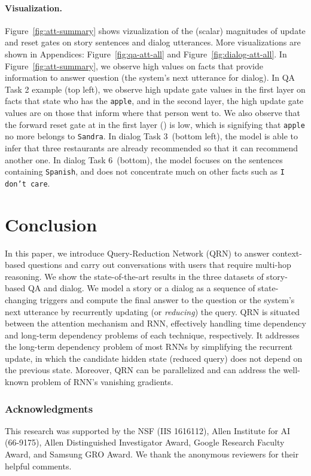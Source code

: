 \documentclass[table]{article}
\begin{document}
\paragraph{Visualization.}
Figure~\ref{fig:att-summary} shows vizualization of the (scalar) magnitudes of update and reset gates on story sentences and dialog utterances.
More visualizations are shown in Appendices: Figure~\ref{fig:qa-att-all} and Figure~\ref{fig:dialog-att-all}.
In Figure~\ref{fig:att-summary}, we observe high values on facts that provide information to answer question (the system's next utterance for dialog).
In QA Task 2 example (top left), we observe high update gate values  in the first layer on facts that state who has the \texttt{apple}, and in the second layer, the high update gate values are on those that inform where that person went to. We also observe that the forward reset gate at  in the first layer () is low, which is signifying that \texttt{apple} no more belongs to \texttt{Sandra}. In dialog Task 3~(bottom left), the model is able to infer that three restaurants are already recommended so that it can recommend another one. In dialog Task 6~(bottom), the model focuses on the sentences containing \texttt{Spanish}, and does not concentrate much on other facts such as \texttt{I don't care}.
 


\section{Conclusion} 
\vspace{-.3cm}
In this paper, we introduce Query-Reduction Network (QRN)  to answer context-based questions and carry out conversations with users that require multi-hop reasoning. 
We show the state-of-the-art results in the three datasets of story-based QA and dialog. 
We model a story or a dialog as a sequence of state-changing triggers and compute the final answer to the question or the system's next utterance by recurrently updating (or \emph{reducing}) the query.
QRN is situated between the attention mechanism and RNN, effectively handling time dependency and long-term dependency problems of each technique, respectively.  It addresses the long-term dependency problem of most RNNs by simplifying the recurrent update, in which the candidate hidden state (reduced query) does not depend on the previous state. Moreover, QRN can be parallelized and can address the well-known problem of RNN's vanishing gradients.
\subsubsection*{Acknowledgments}
This research was supported by the NSF (IIS 1616112), Allen Institute for AI (66-9175), Allen Distinguished Investigator Award, Google Research Faculty Award, and Samsung GRO Award. We thank the anonymous reviewers for their helpful comments.
\end{document}
